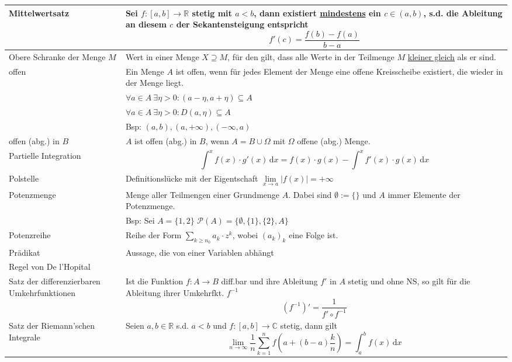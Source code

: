 \documentclass{article}
\newcommand{\diff}{\mathrm{d}}
\newcommand{\lr}[1]{\left(#1\right)}
\begin{document}
\begin{xltabular}{\linewidth}{p{6cm}|X}
	\hline
		Mittelwertsatz & Sei $f:[a,b]\rightarrow\mathbb{R}$ stetig mit $a < b$, dann existiert \underline{mindestens} ein $c\in(a,b)$, s.d. die Ableitung an diesem $c$ der Sekantensteigung entspricht
			$$f'(c) = \frac{f(b) - f(a)}{b - a}$$ \\
	\hline
		Obere Schranke der Menge $M$ & Wert in einer Menge $X \supseteq M$, für den gilt, dass alle Werte in der Teilmenge $M$ \underline{kleiner gleich} als er sind.\\
	\hline
		offen & Ein Menge $A$ ist offen, wenn für jedes Element der Menge eine offene Kreisscheibe existiert, die wieder in der Menge liegt. \\
		&  $\forall a\in A\ \exists\eta > 0: (a - \eta, a + \eta) \subseteq A$ \\
		&  $\forall a\in A\ \exists\eta > 0: D(a,\eta) \subseteq A$ \\
		& Bsp: $(a,b), (a,+\infty), (-\infty, a)$ \\
	\hline
		offen (abg.) in $B$ & $A$ ist offen (abg.) in $B$, wenn $A = B \cup \Omega$ mit $\Omega$ offene (abg.) Menge. \\
	\hline
		Partielle Integration & $$\int^x f(x)\cdot g'(x)\,\diff x = f(x)\cdot g(x) - \int^x f'(x)\cdot g(x)\,\diff x$$ \\
	\hline
		Polstelle & Definitionslücke mit der Eigentschaft $\lim\limits_{x\rightarrow a} |f(x)| = +\infty$ \\
	\hline
		Potenzmenge & Menge aller Teilmengen einer Grundmenge $A$. Dabei sind $\emptyset := \{\}$ und $A$ immer Elemente der Potenzmenge.\\
		& Bsp: Sei $A = \{1,2\}$ $\mathcal{P}(A) = \{\emptyset,\{1\},\{2\},A\}$ \\
	\hline
		Potenzreihe & Reihe der Form $\sum_{k\geq n_0} a_k \cdot z^k$, wobei $(a_k)_k$  eine Folge ist. \\
	\hline
		Prädikat & Aussage, die von einer Variablen abhängt \\
	\hline
		Regel von De l'Hopital &  \\
	\hline
		Satz der differenzierbaren Umkehrfunktionen & Ist die Funktion $f:A\rightarrow B$ diff.bar und ihre Ableitung $f'$ in $A$ stetig und ohne NS, so gilt für die Ableitung ihrer Umkehrfkt. $f^{-1}$
			$$(f^{-1})' = \frac{1}{f'\circ f^{-1}}$$ \\
	\hline
		Satz der Riemann'schen Integrale & Seien $a,b\in\mathbb{R}$ s.d. $a < b$ und $f:[a,b]\rightarrow\mathbb{C}$ stetig, dann gilt
			$$\lim\limits_{n\rightarrow\infty} \frac{1}{n}\sum_{k=1}^n f\lr{a + (b - a)\frac{k}{n}} = \int_a^b f(x)\,\diff x$$ \\

\end{xltabular}
\end{document}
